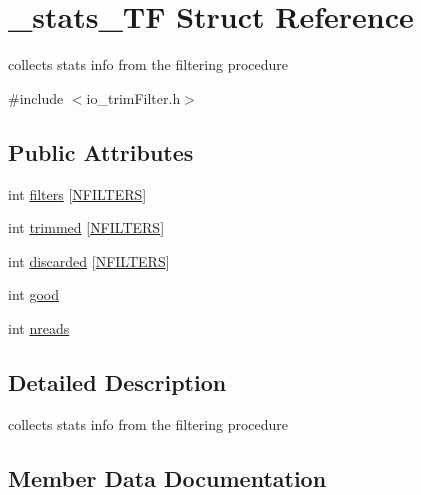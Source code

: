 \hypertarget{struct__stats__TF}{}\section{\+\_\+stats\+\_\+\+TF Struct Reference}
\label{struct__stats__TF}


collects stats info from the filtering procedure  




{\ttfamily \#include $<$io\+\_\+trim\+Filter.\+h$>$}

\subsection*{Public Attributes}
\begin{DoxyCompactItemize}
\item 
int \mbox{\hyperlink{struct__stats__TF_a47d4caef2878e2c10e7571cfdd2d9619}{filters}} \mbox{[}\mbox{\hyperlink{defines_8h_a23f1103d8247781ab0be4b0fba2f085f}{N\+F\+I\+L\+T\+E\+RS}}\mbox{]}
\item 
int \mbox{\hyperlink{struct__stats__TF_a399de2eb5fd452f019d5c8d23bae0651}{trimmed}} \mbox{[}\mbox{\hyperlink{defines_8h_a23f1103d8247781ab0be4b0fba2f085f}{N\+F\+I\+L\+T\+E\+RS}}\mbox{]}
\item 
int \mbox{\hyperlink{struct__stats__TF_a876a430dbbb78e3b03f9e7088da26618}{discarded}} \mbox{[}\mbox{\hyperlink{defines_8h_a23f1103d8247781ab0be4b0fba2f085f}{N\+F\+I\+L\+T\+E\+RS}}\mbox{]}
\item 
int \mbox{\hyperlink{struct__stats__TF_a4d36ddc878d561051a0f9464df2e0911}{good}}
\item 
int \mbox{\hyperlink{struct__stats__TF_a2a3993588191eb9f03416cce4fb1862f}{nreads}}
\end{DoxyCompactItemize}


\subsection{Detailed Description}
collects stats info from the filtering procedure 

\subsection{Member Data Documentation}
\mbox{\label{struct__stats__TF_a876a430dbbb78e3b03f9e7088da26618}} 
